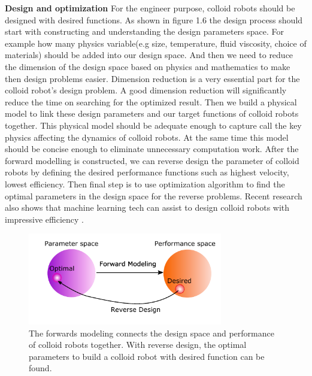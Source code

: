 \textbf{Design and optimization} For the engineer purpose, colloid robots should be designed with desired functions. \cite{liebchen2019optimal} As shown in figure 1.6 the design process should start with constructing and understanding the design parameters space. For example how many physics variable(e.g size, temperature, fluid viscosity, choice of materials) should be added into our design space. And then we  need to reduce the dimension of the design space based on physics and mathematics to make then design problems easier. Dimension reduction is a very essential part for the colloid robot's design problem. A good dimension reduction will significantly reduce the time on searching for the optimized result. Then we build a physical model to link these design parameters and our target functions of colloid robots together. This physical model should be adequate enough  to capture call the key physics affecting the dynamics of colloid robots. At the same time this model should be concise enough to eliminate unnecessary computation work. After the forward modelling is constructed, we can reverse design the parameter of colloid robots by defining the desired performance functions such as highest velocity, lowest efficiency. Then final step is to use  optimization algorithm to find the optimal parameters in the design space for the reverse problems. \cite{ward1963hierarchical,nocedal2006numerical} Recent research also shows that machine learning tech can assist to design colloid robots with impressive efficiency .\cite{yang2020micro,yang2020cargo,yang2019deep,tsang2018self}
\begin{figure}
\centering
\includegraphics[width=8.5cm]{figures/1_6.pdf}
\caption{The forwards modeling connects the design space and performance of colloid robots together. With reverse design, the optimal parameters to build a colloid robot with desired function can be found.}
\label{fig:1.6}
\end{figure}


